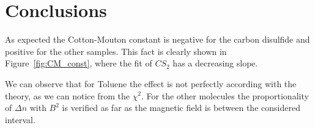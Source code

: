 \documentclass[11pt,a4paper]{article}
\begin{document}
\section{Conclusions}
As expected the Cotton-Mouton constant is negative for the carbon disulfide and positive for the other samples. This fact is clearly shown in Figure~\ref{fig:CM_const}, where the fit of $CS_2$ has a decreasing slope. 

We can observe that for Toluene the effect is not perfectly according with the theory, as we can notice from the $\chi^2$. For the other molecules the proportionality of $\Delta n$ with $B^2$ is verified as far as the magnetic field is between the considered interval.

{\color{white}\cite{wilson1997simple}\cite{note19923}\cite{montarou2004two}\cite{freiser1968survey}}
\newpage


\end{document}
